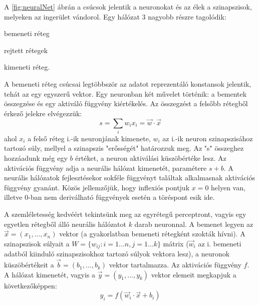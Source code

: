 A \ref{fig:neuralNet} ábrán a csúcsok jelentik a neuronokat és az élek a szinapszisok, melyeken az ingerület vándorol. Egy hálózat 3 nagyobb részre tagolódik:
\begin{enumerate*}[label={\alph*)},font=\bfseries]
	\item bemeneti réteg
	\item rejtett rétegek
	\item kimeneti réteg.
\end{enumerate*}
A bemeneti réteg csúcsai legtöbbször az adatot reprezentáló konstansok jelentik, tehát az egy egyszerű vektor.
Egy neuronban két művelet történik: a bementek összegzése és egy aktiváló függvény kiértékelés. Az összegzést a felsőbb rétegből érkező jelekre elvégezzük:
\begin{displaymath}
	s = \sum_i{w_ix_i} = \vec{w}\cdot\vec{x}
\end{displaymath}
ahol $x_i$ a felső réteg i.-ik neuronjának kimenete, $w_i$ az i.-ik neuron szinapszisához tartozó súly, mellyel a szinapszis "erősségét" határozzuk meg. Az "s" összeghez hozzáadunk még egy $b$ értéket, a neuron aktiválási küszöbértéke lesz.
Az aktivációs függvény adja a neurális hálózat kimenetét, paramétere $s+b$.
A neurális hálózatok fejlesztésekor sokféle függvényt találtak alkalmasnak aktivációs függvény gyanánt. Közös jellemzőjük, hogy inflexiós pontjuk $x=0$ helyen van, illetve 0-ban nem deriválható függvények esetén a töréspont esik ide.

A szemléletesség kedvéért tekintsünk meg az egyrétegű perceptront, vagyis egy egyetlen rétegből álló neurális hálózatot $k$ darab neuronnal. A bemenet legyen az $\vec{x}=(x_1,\dots,x_n)$ vektor (a gyakorlatban bemeneti rétegként szokták hívni). A szinapszisok súlyait a $W=\{w_{ij}:i=1\dots n,j=1\dots k\}$  mátrix ($\vec{w}_i$ az i. bemeneti adatból kiinduló szinapszisokhoz tartozó súlyok vektora lesz), a neuronok küszöbértékeit a $\vec{b}=(b_1,\dots,b_k)$ vektor tartalmazza. Az aktivációs függvény $f$. A hálózat kimenetét, vagyis a  $\vec{y}=(y_1,\dots,y_k)$ vektor elemeit megkapjuk a következőképpen:
\begin{displaymath}
	y_i = f(\vec{w}_i\cdot\vec{x}+b_i)
\end{displaymath}

